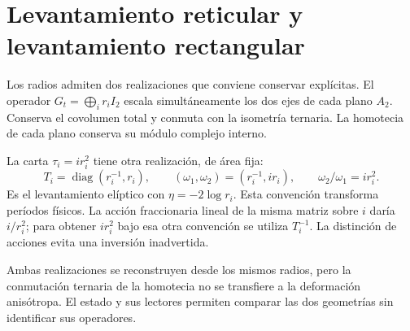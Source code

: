\section{Levantamiento reticular y levantamiento rectangular}

Los radios admiten dos realizaciones que conviene conservar explícitas. El operador \(G_t=\bigoplus_i r_iI_2\) escala simultáneamente los dos ejes de cada plano \(A_2\). Conserva el covolumen total y conmuta con la isometría ternaria. La homotecia de cada plano conserva su módulo complejo interno.

La carta \(\tau_i=ir_i^2\) tiene otra realización, de área fija:
\[
 T_i=\operatorname{diag}(r_i^{-1},r_i),\qquad
 (\omega_1,\omega_2)=(r_i^{-1},ir_i),\qquad
 \omega_2/\omega_1=ir_i^2.
\]
Es el levantamiento elíptico con \(\eta=-2\log r_i\). Esta convención transforma períodos físicos. La acción fraccionaria lineal de la misma matriz sobre \(i\) daría \(i/r_i^2\); para obtener \(ir_i^2\) bajo esa otra convención se utiliza \(T_i^{-1}\). La distinción de acciones evita una inversión inadvertida.

Ambas realizaciones se reconstruyen desde los mismos radios, pero la conmutación ternaria de la homotecia no se transfiere a la deformación anisótropa. El estado y sus lectores permiten comparar las dos geometrías sin identificar sus operadores.
